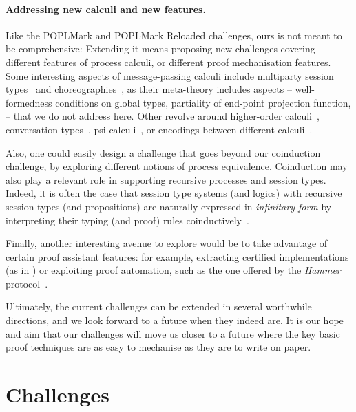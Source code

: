 \documentclass[runningheads]{llncs}
\begin{document}
\paragraph{Addressing new calculi and new features.}
Like the POPLMark and POPLMark Reloaded challenges, ours
is not meant to be comprehensive: Extending it means proposing new
challenges covering different features of process calculi, or
different proof mechanisation features.  Some interesting aspects of
message-passing calculi include
multiparty session types~\cite{10.1145/2827695} and
choreographies~\cite{Carbone2013}, as their meta-theory includes
aspects -- \eg well-formedness conditions on global types, partiality
of end-point projection function, \etc -- that we do not address
here. Other revolve around higher-order calculi~\cite{Hirsch2022},
conversation types~\cite{DBLP:journals/tcs/CairesV10},
psi-calculi~\cite{lmcs:696}, or encodings between different
calculi~\cite{DBLP:journals/iandc/Gorla10,
  DBLP:conf/ecoop/ScalasDHY17}.

Also, one could easily design a challenge that goes beyond our
coinduction challenge, by exploring different notions of process equivalence.
%
Coinduction may also play a relevant role in supporting recursive processes and
session types. Indeed, it is often the case that session type systems (and
logics) with recursive session types (and propositions) are naturally expressed
in \emph{infinitary form} by interpreting their typing (and proof) rules
coinductively~\cite{%
DerakhshanPfenning22,HornePadovani23}.

Finally, another interesting avenue to explore would be to take
advantage of certain proof assistant features: for example, extracting
certified implementations (as in \cite{Castro-Perez2021}) or exploiting
proof automation, such as the one offered by the \emph{Hammer}
protocol~\cite{BohmeN10,CzajkaK18}.

Ultimately, the current challenges can be extended in several worthwhile directions, and we look forward to a future when they indeed are.
It is our hope and aim that our challenges will move us closer to a future where the key basic proof techniques are as easy to mechanise as they are to write on paper.




\clearpage
\appendix
\section{Challenges}\label{app:challenges}

\end{document}
